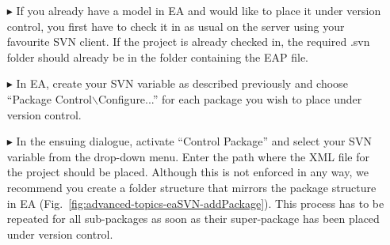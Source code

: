 \begin{enumerate}

\item[$\blacktriangleright$] If you already have a model in EA and would like to place it under version control, you first have to check it in as usual on the server using your favourite SVN client. 
If the project is already checked in, the required .svn folder should already be in the folder containing the EAP file.

\item[$\blacktriangleright$] In EA, create your SVN variable as described previously and choose ``Package Control$\backslash$Configure...'' for each package you wish to place under version control. 

\item[$\blacktriangleright$] In the ensuing dialogue, activate ``Control Package'' and select your SVN variable from the drop-down menu. 
Enter the path where the XML file for the project should be placed.
Although this is not enforced in any way, we recommend you create a folder structure that mirrors the package structure in EA (Fig.~\ref{fig:advanced-topics-eaSVN-addPackage}).
This process has to be repeated for all sub-packages as soon as their super-package has been placed under version control.
\end{enumerate}

